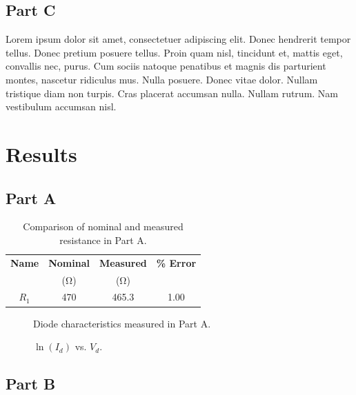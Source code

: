 \documentclass{article}
\begin{document}
\subsection{Part C}
\label{sec:proc_c}

Lorem ipsum dolor sit amet, consectetuer adipiscing elit. Donec
hendrerit tempor tellus. Donec pretium posuere tellus. Proin quam
nisl, tincidunt et, mattis eget, convallis nec, purus. Cum sociis
natoque penatibus et magnis dis parturient montes, nascetur ridiculus
mus. Nulla posuere. Donec vitae dolor. Nullam tristique diam non
turpis. Cras placerat accumsan nulla. Nullam rutrum. Nam vestibulum
accumsan nisl.

\section{Results}
\label{sec:results}

\subsection{Part A}
\label{sec:result_a}

\begin{table}[hbtp]
  \centering
  \begin{tabular}{*{4}{c}}
    \textbf{Name} & \textbf{Nominal} & \textbf{Measured} & \textbf{\% Error} \\
    & (\si{\ohm}) & (\si{\ohm}) & \\
    \hline
    $R_1$ & 470 & 465.3 & 1.00 \\
  \end{tabular}
  \caption{\label{tab:percent_err} Comparison of nominal and measured resistance in Part A.}
\end{table}
    
\begin{figure}[hbtp]
  \centering
  
  \caption{\label{fig:part_a_graph} Diode characteristics measured in Part A.}
\end{figure}

\begin{figure}[hbtp]
  \centering
  
  \caption{\label{fig:part_a_graph2} $\ln{(I_d)}$ vs. $V_d$.}
\end{figure}

\subsection{Part B}
\label{sec:result_b}
\end{document}
